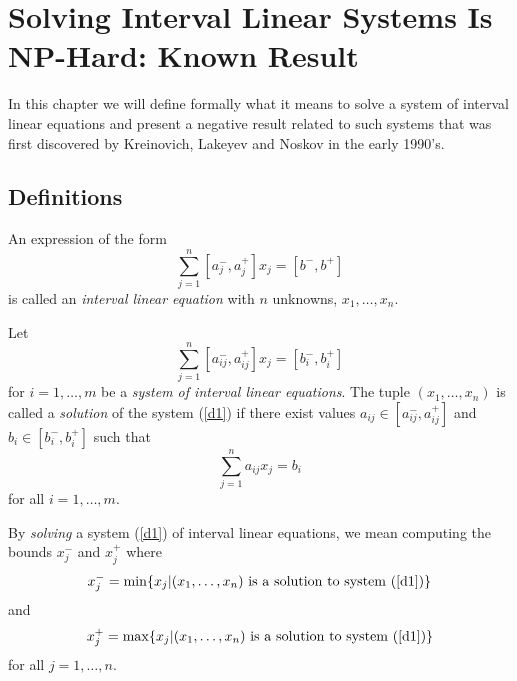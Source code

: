 
\chapter{Solving Interval Linear Systems Is NP-Hard: Known Result}

In this chapter we will define formally what it means to solve a system of
interval linear equations and present a negative result related to such
systems that was first discovered by Kreinovich, Lakeyev and Noskov in the
early 1990's.

\section{Definitions}

\begin{definition}
{\rm An expression of the form
\begin{equation}
  \sum_{j=1}^n [a_j^-,a_j^+] x_j = [b^-,b^+] \label{intlineq}
\end{equation}
is called an {\em interval linear equation\/} with $n$ unknowns,
$x_1,\ldots,x_n$.}
\end{definition}

\begin{definition} \label{solutiondef}
{\rm Let
\begin{equation}
  \sum_{j=1}^n [a_{ij}^-, a_{ij}^+] x_j = [b_i^-, b_i^+] \label{d1}
\end{equation}
for $i=1,\ldots,m$ be a {\em system of interval linear equations}.  The
tuple $(x_1,\ldots,x_n)$ is called a {\em solution\/} of the system (\ref{d1})
if there exist values $a_{ij}\in[a_{ij}^-,a_{ij}^+]$ and $b_i\in[b_i^-,b_i^+]$
such that
$$
  \sum_{j=1}^n a_{ij} x_j = b_i
$$
for all $i=1,\ldots,m$.}
\end{definition}

\begin{definition}\label{solvingdef}
{\rm By {\em solving\/} a system (\ref{d1}) of interval linear equations, we
mean computing the bounds $x_j^-$ and $x_j^+$ where
$$
  x_j^-=\min\{x_j|(x_1,\ldots,x_n)
   {\rm\ is\ a\ solution\ to\ system\ (\ref{d1})}\}
$$
and
$$
  x_j^+=\max\{x_j|(x_1,\ldots,x_n)
   {\rm\ is\ a\ solution\ to\ system\ (\ref{d1})}\}
$$
for all $j=1,\ldots,n$.}
\end{definition}

